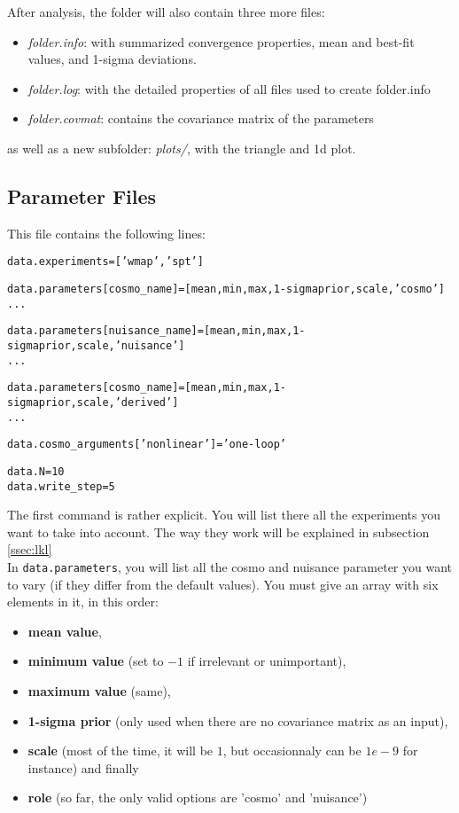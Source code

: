 \documentclass[10pt]{article}
\begin{document}
  After analysis, the folder will also contain three more files:
  \begin{itemize}
    \item \emph{folder.info}: with summarized convergence properties, mean and
      best-fit values, and 1-sigma deviations.
    \item \emph{folder.log}:  with the detailed properties of all files used to create
      folder.info
    \item \emph{folder.covmat}: contains the covariance matrix of the parameters
  \end{itemize}
  as well as a new subfolder: \emph{plots/}, with the triangle and 1d plot.



  \subsection{Parameter Files}
  This file contains the following lines:

  \begin{alltt}
    data.experiments = ['wmap','spt']
    
    data.parameters[cosmo_name]       = [mean,min,max,1-sigma prior,scale,'cosmo']
    ...

    data.parameters[nuisance_name]    = [mean,min,max,1-sigma prior,scale,'nuisance']
    ...

    data.parameters[cosmo_name]       = [mean,min,max,1-sigma prior,scale,'derived']
    ...

    data.cosmo_arguments['non linear']           = 'one-loop'

    data.N = 10
    data.write_step = 5
  \end{alltt}

  The first command is rather explicit. You will list there all the experiments
  you want to take into account. The way they work will be explained in
  subsection \ref{ssec:lkl}\\

  In \verb?data.parameters?, you will list all the cosmo and nuisance parameter you
  want to vary (if they differ from the default values). You must give an array
  with six elements in it, in this order: 
  \begin{itemize}
    \item {\bf mean value}, 
    \item {\bf minimum value} (set to $-1$ if irrelevant or unimportant), 
    \item {\bf maximum value} (same), 
    \item {\bf 1-sigma prior} (only used when there are no covariance matrix as
      an input),
    \item {\bf scale} (most of the time, it will be $1$, but occasionnaly can
      be $1e-9$ for instance) and finally 
    \item {\bf role} (so far, the only valid options are 'cosmo' and
      'nuisance')
  \end{itemize}
  
\end{document}
